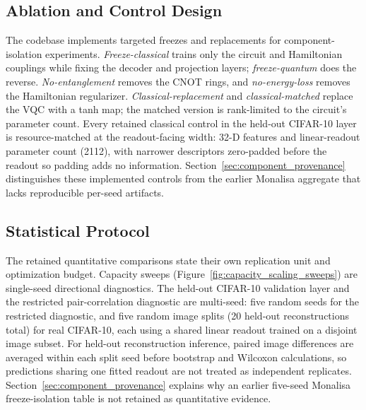 \documentclass[11pt]{article}
\begin{document}
\subsection{Ablation and Control Design}
The codebase implements targeted freezes and replacements for component-isolation experiments. \emph{Freeze-classical} trains only the circuit and Hamiltonian couplings while fixing the decoder and projection layers; \emph{freeze-quantum} does the reverse. \emph{No-entanglement} removes the CNOT rings, and \emph{no-energy-loss} removes the Hamiltonian regularizer. \emph{Classical-replacement} and \emph{classical-matched} replace the VQC with a tanh map; the matched version is rank-limited to the circuit's parameter count. Every retained classical control in the held-out CIFAR-10 layer is resource-matched at the readout-facing width: 32-D features and linear-readout parameter count (2112), with narrower descriptors zero-padded before the readout so padding adds no information. Section~\ref{sec:component_provenance} distinguishes these implemented controls from the earlier Monalisa aggregate that lacks reproducible per-seed artifacts.

\subsection{Statistical Protocol}
The retained quantitative comparisons state their own replication unit and optimization budget. Capacity sweeps (Figure~\ref{fig:capacity_scaling_sweeps}) are single-seed directional diagnostics. The held-out CIFAR-10 validation layer and the restricted pair-correlation diagnostic are multi-seed: five random seeds for the restricted diagnostic, and five random image splits (20 held-out reconstructions total) for real CIFAR-10, each using a shared linear readout trained on a disjoint image subset. For held-out reconstruction inference, paired image differences are averaged within each split seed before bootstrap and Wilcoxon calculations, so predictions sharing one fitted readout are not treated as independent replicates. Section~\ref{sec:component_provenance} explains why an earlier five-seed Monalisa freeze-isolation table is not retained as quantitative evidence.
\end{document}
